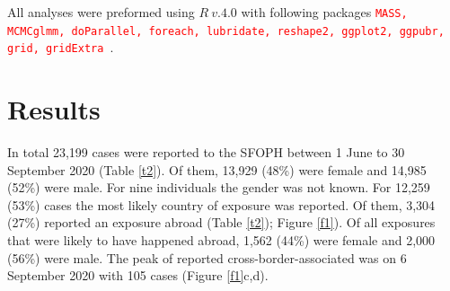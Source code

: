 \documentclass[10pt, a4paper, twoside]{article}
\begin{document}
\begin{multicols}{2}
All analyses were preformed using $R ~v.4.0$ with following packages \textcolor{red}{\texttt{MASS, MCMCglmm, doParallel, foreach, lubridate, reshape2, ggplot2, ggpubr, grid, gridExtra }}.\cite{r_core_team_r_2020,venables_modern_2002}

\section{Results}
In total 23,199 cases were reported to the SFOPH between 1 June to 30 September 2020 (Table \ref{t2}). 
Of them, 13,929 (48\%) were female and 14,985 (52\%) were male.
For nine individuals the gender was not known.
For 12,259 (53\%) cases the most likely country of exposure was reported.
Of them, 3,304 (27\%) reported an exposure abroad (Table \ref{t2}); Figure \ref{f1}).
Of all exposures that were likely to have happened abroad, 1,562 (44\%) were female and 2,000 (56\%) were male.
The peak of reported cross-border-associated was on 6 September 2020 with 105 cases (Figure \ref{f1}c,d).

\end{multicols}
\begin{landscape}
\global\pdfpageattr\expandafter{\the\pdfpageattr/Rotate 90}
}
\end{landscape}
\end{document}
